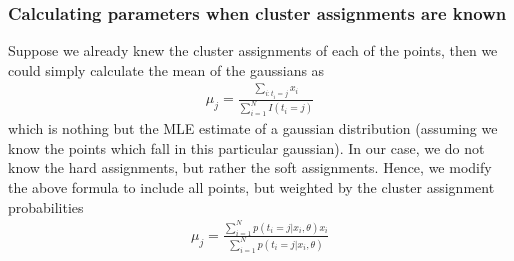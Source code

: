 \documentclass[../statistical_learning_notes.tex]{subfiles}
\begin{document}
    \subsubsection*{Calculating parameters when cluster assignments are known}
    Suppose we already knew the cluster assignments of each of the points, then we could simply calculate the mean of the gaussians as
    \begin{align*}
        \mu_{j} = \frac{\sum_{i:t_{i} = j} x_{i}}{\sum_{i=1}^{N} I(t_{i} = j)}  
    \end{align*}
    which is nothing but the MLE estimate of a gaussian distribution (assuming we know the points which fall in this particular gaussian). In our case, we do not know the hard assignments, but rather the soft assignments. Hence, we modify the above formula to include all points, but weighted by the cluster assignment probabilities
    \begin{align*}
        \mu_{j} = \frac{\sum_{i=1}^{N} p(t_{i} = j|x_{i}, \theta) x_{i}}{\sum_{i=1}^{N} p(t_{i} = j|x_{i}, \theta)}
    \end{align*}
\end{document}
